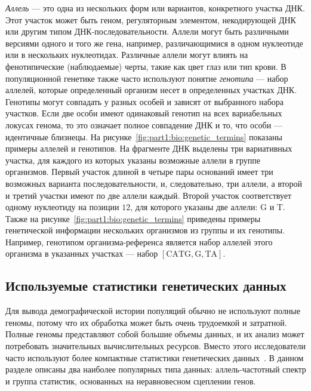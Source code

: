 \emph{Аллель} --- это одна из нескольких форм или вариантов, конкретного участка ДНК.
Этот участок может быть геном, регуляторным элементом, некодирующей ДНК или другим типом ДНК-последовательности.
Аллели могут быть различными версиями одного и того же гена, например, различающимися в одном нуклеотиде или в нескольких нуклеотидах.
Различные аллели могут влиять на фенотипические (наблюдаемые) черты, такие как цвет глаз или тип крови.
В популяционной генетике также часто используют понятие \emph{генотипа} --- набор аллелей, которые определенный организм несет в определенных участках ДНК.
Генотипы могут совпадать у разных особей и зависят от выбранного набора участков.
Если две особи имеют одинаковый генотип на всех вариабельных локусах генома, то это означает полное совпадение ДНК и то, что особи --- идентичные близнецы.
На рисунке~\ref{fig:part1:bio:genetic_termins} показаны примеры аллелей и генотипов.
На фрагменте ДНК выделены три вариативных участка, для каждого из которых указаны возможные аллели в группе организмов.
Первый участок длиной в четыре пары оснований имеет три возможных варианта последовательности, и, следовательно, три аллели, а второй и третий участки имеют по две аллели каждый.
Второй участок соответствует одному нуклеотиду на позиции $12$, для которого указаны две аллели: G и T.
Также на рисунке~\ref{fig:part1:bio:genetic_termins} приведены примеры генетической информации нескольких организмов из группы и их генотипы.
Например, генотипом организма-референса является набор аллелей этого организма в указанных участках --- набор $[\text{CATG}, \text{G}, \text{TA}]$.





\subsection{Используемые статистики генетических данных}
\label{sec:part1:dem_inf:data_stats}

Для вывода демографической истории популяций обычно не используют полные геномы, потому что их обработка может быть очень трудоемкой и затратной.
Полные геномы представляют собой большие объемы данных, и их анализ может потребовать значительных вычислительных ресурсов.
Вместо этого исследователи часто используют более компактные статистики генетических данных~\cite{schraiber2015methods}.
В данном разделе описаны два наиболее популярных типа данных: аллель-частотный спектр и группа статистик, основанных на неравновесном сцеплении генов.


